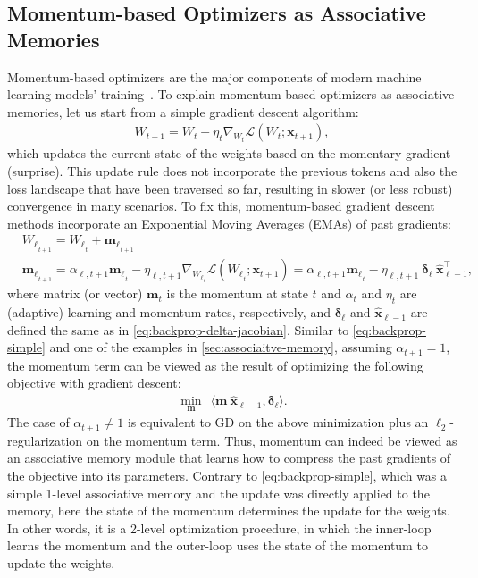 \documentclass{article}
\newcommand{\citep}{\parencite}
\newcommand{\inner}[2]{\langle #1, #2 \rangle}
\begin{document}
\subsection{Momentum-based Optimizers as Associative Memories}\label{sec:momentum-based}
Momentum-based optimizers are the major components of modern machine learning models' training~\citep{kingma2014adam, jordanmuon, duchi2011adaptive}. To explain momentum-based optimizers as associative memories, let us start from a simple gradient descent algorithm:
\begin{align}
    W_{t+1} = W_{t} - \eta_t \nabla_{W_{t}} \mathcal{L} (W_t; \boldsymbol{x}_{t+1}),
\end{align}
which updates the current state of the weights based on the momentary gradient (surprise). This update rule does not incorporate the previous tokens and also the loss landscape that have been traversed so far, resulting in slower (or less robust) convergence in many scenarios. To fix this, momentum-based gradient descent methods incorporate an Exponential Moving Averages (EMAs) of past gradients:
\begin{align}\nonumber
    &{W_{\ell}}_{_{t+1}} = {W_{\ell}}_{_{t}} + {\boldsymbol{m}_{\ell}}_{_{t+1}}\\ \label{eq:momentum1}
    &{\boldsymbol{m}_{\ell}}_{_{t+1}} = \alpha_{\ell, t+1} {\boldsymbol{m}_{\ell}}_{_{t}} - \eta_{\ell, t+1} \nabla_{{W_{\ell}}_{_{t}}} \mathcal{L}\left({W_{\ell}}_{_{t}}; \boldsymbol{x}_{t+1}\right) = \alpha_{\ell, t+1} {\boldsymbol{m}_{\ell}}_{_{t}} - \eta_{\ell, t+1} \: \boldsymbol{\delta}_{\ell} \: \hat{\boldsymbol{x}}_{\ell - 1}^{\top}, 
\end{align}
where matrix (or vector) $\boldsymbol{m}_t$ is the momentum at state $t$ and $\alpha_t$ and $\eta_t$ are (adaptive) learning and momentum rates, respectively, and $\boldsymbol{\delta}_{\ell}$ and $\hat{\boldsymbol{x}}_{\ell - 1}$ are defined the same as in \autoref{eq:backprop-delta-jacobian}. Similar to \autoref{eq:backprop-simple} and one of the examples in \autoref{sec:associaitve-memory}, {assuming $\alpha_{t+1} =1$}, the momentum term can be viewed as the result of optimizing the following objective with gradient descent:
\begin{align}\label{eq:momentum-map1}
    \min_{\boldsymbol{m}}\:\: \inner{\boldsymbol{m} \: \hat{\boldsymbol{x}}_{\ell - 1}}{\boldsymbol{\delta}_{\ell}}. 
\end{align}
The case of $\alpha_{t+1} \neq 1$ is equivalent to GD on the above minimization plus an $\ell_2$-regularization on the momentum term. Thus, momentum can indeed be viewed as an associative memory module that learns how to compress the past gradients of the objective into its parameters. Contrary to \autoref{eq:backprop-simple}, which was a simple 1-level associative memory and the update was directly applied to the memory, here the state of the momentum determines the update for the weights. In other words, it is a 2-level optimization procedure, in which the inner-loop learns the momentum and the outer-loop uses the state of the momentum to update the weights. 
\end{document}
